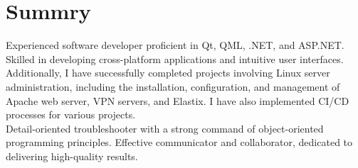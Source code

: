 \section{Summry}
Experienced software developer proficient in Qt, QML, .NET, and ASP.NET. Skilled in developing cross-platform applications and intuitive user interfaces. Additionally, I have successfully completed projects involving Linux server administration, including the installation, configuration, and management of Apache web server, VPN servers, and Elastix. I have also implemented CI/CD processes for various projects.
\\
Detail-oriented troubleshooter with a strong command of object-oriented programming principles. Effective communicator and collaborator, dedicated to delivering high-quality results.
